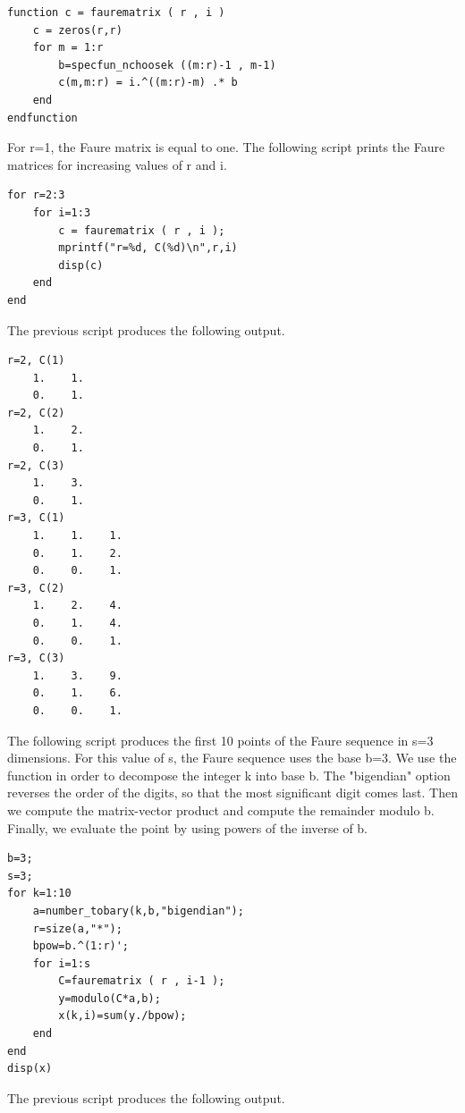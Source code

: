 \lstset{language=scilabscript}
\begin{lstlisting}
function c = faurematrix ( r , i )
    c = zeros(r,r)
    for m = 1:r
        b=specfun_nchoosek ((m:r)-1 , m-1)
        c(m,m:r) = i.^((m:r)-m) .* b
    end
endfunction
\end{lstlisting}

    
      For r=1, the Faure matrix is equal to one.
      The following script prints the Faure matrices for increasing
      values of r and i.
    

\lstset{language=scilabscript}
\begin{lstlisting}
for r=2:3
    for i=1:3
        c = faurematrix ( r , i );
        mprintf("r=%d, C(%d)\n",r,i)
        disp(c)
    end
end
\end{lstlisting}

    
      The previous script produces the following output.
    

\lstset{language=scilabscript}
\begin{lstlisting}
r=2, C(1)
    1.    1.  
    0.    1.  
r=2, C(2)
    1.    2.  
    0.    1.  
r=2, C(3)
    1.    3.  
    0.    1.  
r=3, C(1)
    1.    1.    1.  
    0.    1.    2.  
    0.    0.    1.  
r=3, C(2)
    1.    2.    4.  
    0.    1.    4.  
    0.    0.    1.  
r=3, C(3)
    1.    3.    9.  
    0.    1.    6.  
    0.    0.    1.  
\end{lstlisting}

    
      The following script produces the first 10 points
      of the Faure sequence in s=3 dimensions.
      For this value of s, the Faure sequence uses the base b=3.
      We use the  function in order
      to decompose the integer k into base b.
      The "bigendian" option reverses the order of the digits,
      so that the most significant digit comes last.
      Then we compute the matrix-vector product 
      and compute the remainder modulo b.
      Finally, we evaluate the point by using powers of the
      inverse of b.
    

\lstset{language=scilabscript}
\begin{lstlisting}
b=3;
s=3;
for k=1:10
    a=number_tobary(k,b,"bigendian");
    r=size(a,"*");
    bpow=b.^(1:r)';
    for i=1:s
        C=faurematrix ( r , i-1 );
        y=modulo(C*a,b);
        x(k,i)=sum(y./bpow);
    end
end
disp(x)
\end{lstlisting}

    
      The previous script produces the following output.
    

